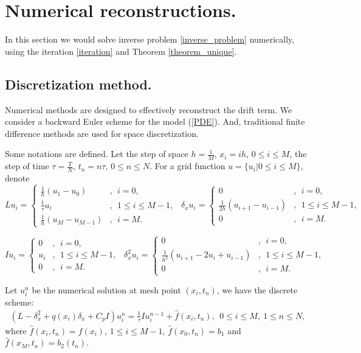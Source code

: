 \documentclass[11pt]{article}
\numberwithin{equation}{section}
\begin{document}
\section{Numerical reconstructions.}\label{section_num}
In this section we would solve inverse problem \eqref{inverse_problem} numerically, using the iteration \eqref{iteration} and Theorem \ref{theorem_unique}. 

\subsection{Discretization method.}
Numerical methods are designed to effectively reconstruct the drift term. 
We consider a backward Euler scheme for the model (\ref{PDE}). And, traditional finite difference methods are used for space discretization. 

Some notations are defined. Let the step of space $h=\frac{1}{M}$, $x_i=ih$, $0\le i\le M$, the step of time $\tau=\frac{T}{N}$, $t_n=n\tau$, $0\le n\le N$. For a grid function $u=\{u_i|0\le i\le M\}$, denote 
$$
Lu_i=\left\{
\begin{aligned}
\frac{1}{h}(u_{1}-u_{0})&,~~i=0,\\
\frac{1}{\tau}u_i&,~~1\le i\le M-1,\\  
\frac{1}{h}(u_{M}-u_{M-1})&,~~i=M.
\end{aligned}
\right.~~
\delta_x u_i=\left\{
\begin{aligned}
0&,~~i=0,\\
\frac{1}{2h}(u_{i+1}-u_{i-1})&,~~1\le i\le M-1,\\  
0&,~~i=M.
\end{aligned}
\right.
$$

$$
Iu_i=\left\{
\begin{aligned}
0&,~~i=0,\\
u_i&,~~1\le i\le M-1,\\  
0&,~~i=M.
\end{aligned}
\right.~~
\delta_x^2 u_i=\left\{
\begin{aligned}
0&,~~i=0,\\
\frac{1}{h^2}(u_{i+1}-2u_{i}+u_{i-1})&,~~1\le i\le M-1,\\  
0&,~~i=M.
\end{aligned}
\right.
$$

Let $u_i^n$ be the numerical solution at mesh point $(x_i,t_n)$, we have the discrete scheme:
\begin{align}\label{ds}
(L-\delta_x^2+q(x_i)\delta_x+C_pI)u_i^n=\frac{1}{\tau}Iu_i^{n-1}+\hat{f}(x_i,t_n),~~0\le i\le M,~1\le n\le N,
\end{align}
where $\hat{f}(x_i,t_n)=f(x_i)$, $1\le i\le M-1$, $\hat{f}(x_0,t_n)=b_1$ and $\hat{f}(x_M,t_n)=b_2(t_n)$.
\end{document}
